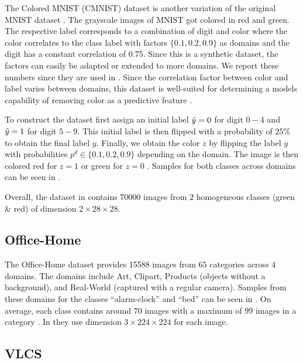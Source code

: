 The Colored MNIST (CMNIST) dataset \citep{arjovsky2019invariant} is another variation of the original MNIST dataset \citep{lecun-mnisthandwrittendigit-2010}. The grayscale images of MNIST got colored in red and green. The respective label corresponds to a combination of digit and color where the color correlates to the class label with factors $\{0.1,0.2,0.9\}$ as domains and the digit has a constant correlation of $0.75$. Since this is a synthetic dataset, the factors can easily be adapted or extended to more domains. We report these numbers since they are used in \citet{gulrajani2020search, arjovsky2019invariant}. Since the correlation factor between color and label varies between domains, this dataset is well-suited for determining a models capability of removing color as a predictive feature \citep{arjovsky2019invariant}.

To construct the dataset \citet{arjovsky2019invariant} first assign an initial label $\Tilde{y} = 0$ for digit $0-4$ and $\Tilde{y} = 1$ for digit $5-9$. This initial label is then flipped with a probability of $25\%$ to obtain the final label $y$. Finally, we obtain the color $z$ by flipping the label $y$ with probabilities $p^d \in \{0.1,0.2,0.9\}$ depending on the domain. The image is then colored red for $z=1$ or green for $z=0$ \citep{arjovsky2019invariant}. Samples for both classes across domains can be seen in .

Overall, the dataset in \citet{gulrajani2020search} contains \num{70000} images from $2$ homogeneous classes (green \& red) of dimension $2 \times 28 \times 28$.  


\subsection{Office-Home}
The Office-Home dataset \citep{VenkateswaraECP17}  provides \num{15588} images from $65$ categories across $4$ domains. The domains include Art, Clipart, Products (objects without a background), and Real-World (captured with a regular camera). Samples from these domains for the classes ``alarm-clock'' and ``bed'' can be seen in . On average, each class contains around $70$ images with a maximum of $99$ images in a category \citep{VenkateswaraECP17}. In \citet{gulrajani2020search} they use dimension $3 \times 224 \times 224$ for each image. 


\subsection{VLCS}

